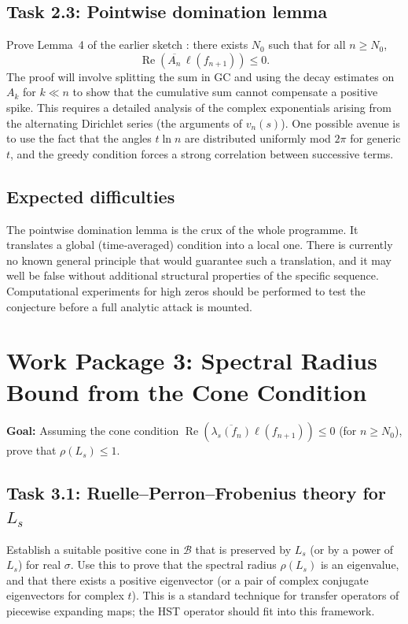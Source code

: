 \documentclass[11pt,a4paper]{article}
\newcommand{\RE}{\operatorname{Re}}
\begin{document}
\subsection{Task 2.3: Pointwise domination lemma}
Prove Lemma~4 of the earlier sketch \cite{VarMech}: there exists $N_0$ such that for all $n \ge N_0$,
\[
\RE( \overline{A_n} \, \ell( f_{n+1} ) ) \le 0.
\]
The proof will involve splitting the sum in GC and using the decay estimates on $A_k$ for $k \ll n$ to show that the cumulative sum cannot compensate a positive spike.  This requires a detailed analysis of the complex exponentials arising from the alternating Dirichlet series (the arguments of $v_n(s)$).  One possible avenue is to use the fact that the angles $t \ln n$ are distributed uniformly mod $2\pi$ for generic $t$, and the greedy condition forces a strong correlation between successive terms.

\subsection{Expected difficulties}
The pointwise domination lemma is the crux of the whole programme.  It translates a global (time‑averaged) condition into a local one.  There is currently no known general principle that would guarantee such a translation, and it may well be false without additional structural properties of the specific sequence.  Computational experiments for high zeros should be performed to test the conjecture before a full analytic attack is mounted.

\section{Work Package 3: Spectral Radius Bound from the Cone Condition}

\textbf{Goal:}  Assuming the cone condition $\RE( \overline{\lambda_s(f_n)} \ell( f_{n+1} ) ) \le 0$ (for $n \ge N_0$), prove that $\rho(L_s) \le 1$.

\subsection{Task 3.1: Ruelle–Perron–Frobenius theory for $L_s$}
Establish a suitable positive cone in $\mathcal{B}$ that is preserved by $L_s$ (or by a power of $L_s$) for real $\sigma$.  Use this to prove that the spectral radius $\rho(L_s)$ is an eigenvalue, and that there exists a positive eigenvector (or a pair of complex conjugate eigenvectors for complex $t$).  This is a standard technique for transfer operators of piecewise expanding maps; the HST operator should fit into this framework.
\end{document}
